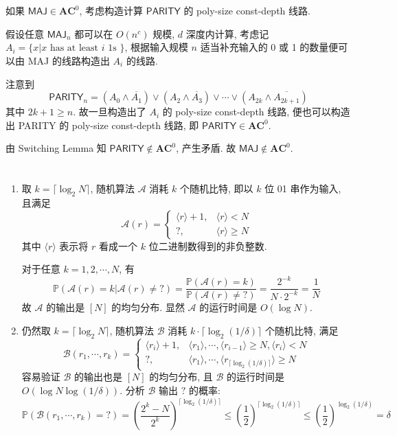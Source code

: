 \documentclass[8pt]{article}
\theoremstyle{compact}
\def\le{\leqslant}
\def\ge{\geqslant}
\begin{document}
\section{}
如果 $\textsf{MAJ} \in \textbf{AC}^0$, 考虑构造计算 $\textsf{PARITY}$ 的 poly-size const-depth 线路.

假设任意 $\textsf{MAJ}_n$ 都可以在 $O(n^c)$ 规模, $d$ 深度内计算, 考虑记 $A_i = \{x | x \text{ has at least } i \text{ 1s }\}$, 根据输入规模 $n$ 适当补充输入的 0 或 1 的数量便可以由 \textsf{MAJ} 的线路构造出 $A_i$ 的线路.

注意到 $$\textsf{PARITY}_n = (A_0 \wedge \overline{A_1}) \vee (A_2 \wedge \overline{A_3}) \vee \cdots \vee (A_{2k} \wedge \overline{A_{2k+1}})$$
其中 $2k + 1 \ge n$. 故一旦构造出了 $A_i$ 的 poly-size const-depth 线路, 便也可以构造出 \textsf{PARITY} 的 poly-size const-depth 线路, 即 $\textsf{PARITY} \in \textbf{AC}^0$.

由 Switching Lemma 知 $\textsf{PARITY} \notin \textbf{AC}^0$, 产生矛盾. 故 $\textsf{MAJ} \notin \textbf{AC}^0$.
\section{}
\begin{enumerate}
	\item 取 $k = \lceil \log_2 N \rceil$, 随机算法 $\mathcal A$ 消耗 $k$ 个随机比特, 即以 $k$ 位 01 串作为输入, 且满足 $$\mathcal A(r) = \begin{cases}
		\langle r \rangle + 1, & \langle r \rangle < N \\
		? , & \langle r \rangle \ge N
	\end{cases}$$
	其中 $\langle r \rangle$ 表示将 $r$ 看成一个 $k$ 位二进制数得到的非负整数.

	对于任意 $k = 1, 2, \cdots, N$, 有 $$\mathbb P(\mathcal A(r) = k | \mathcal A(r) \neq ?) = \frac{\mathbb P(\mathcal A(r) = k)}{\mathbb P(\mathcal A(r) \neq ?)} = \frac{2^{-k}}{N \cdot 2^{-k}} = \frac 1N$$
	故 $\mathcal A$ 的输出是 $[N]$ 的均匀分布. 显然 $\mathcal A$ 的运行时间是 $O(\log N)$.

	\item 仍然取 $k = \lceil \log_2 N \rceil$, 随机算法 $\mathcal B$ 消耗 $k\cdot \lceil \log_2(1 / \delta)\rceil$ 个随机比特, 满足 $$\mathcal B(r_1, \cdots, r_k) = \begin{cases}
		\langle r_i \rangle + 1, & \langle r_1 \rangle, \cdots, \langle r_{i-1} \rangle \ge N, \langle r_i \rangle < N \\
		?, & \langle r_1 \rangle, \cdots, \langle r_{\lceil\log_2(1 / \delta)\rceil} \rangle \ge N
	\end{cases}$$
	容易验证 $\mathcal B$ 的输出也是 $[N]$ 的均匀分布, 且 $\mathcal B$ 的运行时间是 $O(\log N \log(1/\delta))$. 分析 $\mathcal B$ 输出 $?$ 的概率: $$\mathbb P(\mathcal B(r_1, \cdots, r_k) = ?) = \left(\frac{2^k - N}{2^k}\right)^{\lceil \log_2(1 / \delta)\rceil} \le \left(\frac12\right)^{\lceil \log_2(1 / \delta)\rceil} \le \left(\frac12\right)^{\log_2(1 / \delta)} = \delta$$
\end{enumerate}
\end{document}
